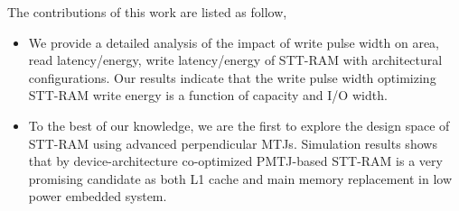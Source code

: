 The contributions of this work are listed as follow,
\begin{itemize}
\item We provide a detailed analysis of the impact of write pulse width on area, read latency/energy, write latency/energy of STT-RAM with architectural configurations. Our results indicate that the write pulse width optimizing STT-RAM write energy is a function of capacity and I/O width.
\item To the best of our knowledge, we are the first to explore the design space of STT-RAM using advanced perpendicular MTJs. Simulation results shows that by device-architecture co-optimized PMTJ-based STT-RAM is a very promising candidate as both L1 cache and main memory replacement in low power embedded system.
\end{itemize} 